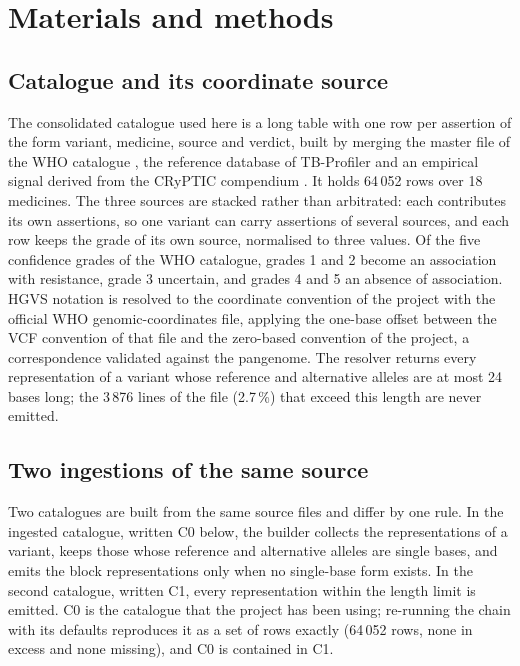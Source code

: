 \documentclass[11pt]{article}
\begin{document}
\section{Materials and methods}

\subsection{Catalogue and its coordinate source}
The consolidated catalogue used here is a long table with one row per assertion of the
form variant, medicine, source and verdict, built by merging the master file of the WHO
catalogue \cite{who2023}, the reference database of TB-Profiler \cite{phelan2019} and an
empirical signal derived from the CRyPTIC compendium \cite{cryptic2022}. It holds 64\,052
rows over 18 medicines. The three sources are stacked rather than arbitrated: each contributes
its own assertions, so one variant can carry assertions of several sources, and each row keeps
the grade of its own source, normalised to three values. Of the five confidence grades of the
WHO catalogue, grades 1 and 2 become an association with resistance, grade 3 uncertain, and
grades 4 and 5 an absence of association. HGVS notation is resolved to the coordinate convention of the
project with the official WHO genomic-coordinates file, applying the one-base offset
between the VCF convention of that file and the zero-based convention of the project, a
correspondence validated against the pangenome. The resolver returns every representation
of a variant whose reference and alternative alleles are at most 24 bases long; the
3\,876 lines of the file (2.7\,\%) that exceed this length are never emitted.

\subsection{Two ingestions of the same source}
Two catalogues are built from the same source files and differ by one rule. In the
ingested catalogue, written C0 below, the builder collects the representations of a
variant, keeps those whose reference and alternative alleles are single bases, and emits
the block representations only when no single-base form exists. In the second catalogue,
written C1, every representation within the length limit is emitted. C0 is the catalogue
that the project has been using; re-running the chain with its defaults reproduces it as a
set of rows exactly (64\,052 rows, none in excess and none missing), and C0 is contained
in C1.
\end{document}
